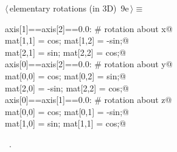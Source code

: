 \documentclass[11pt,oneside]{article}	%
\begin{document}
\begin{flushleft} \small \label{scrap22}
\protect{}$\langle\,$elementary rotations (in 3D)\nobreak\ {\footnotesize 9e}$\,\rangle\equiv$
\vspace{-1ex}
\begin{list}{}{} \item
\mbox{}\verb@if axis[1]==axis[2]==0.0:  # rotation about x@\\
\mbox{}\verb@   mat[1,1] = cos;   mat[1,2] = -sin;@\\
\mbox{}\verb@   mat[2,1] = sin;   mat[2,2] = cos;@\\
\mbox{}\verb@elif axis[0]==axis[2]==0.0:   # rotation about y@\\
\mbox{}\verb@   mat[0,0] = cos;   mat[0,2] = sin;@\\
\mbox{}\verb@   mat[2,0] = -sin;  mat[2,2] = cos;@\\
\mbox{}\verb@elif axis[0]==axis[1]==0.0:   # rotation about z@\\
\mbox{}\verb@   mat[0,0] = cos;   mat[0,1] = -sin;@\\
\mbox{}\verb@   mat[1,0] = sin;   mat[1,1] = cos;@\\
\mbox{}\verb@@{\NWsep}
\end{list}
\vspace{-1ex}
\footnotesize\addtolength{\baselineskip}{-1ex}
\begin{list}{}{\setlength{\itemsep}{-\parsep}\setlength{\itemindent}{-\leftmargin}}
\item \NWtxtMacroRefIn\ .
\end{list}
\end{flushleft}
\end{document}
